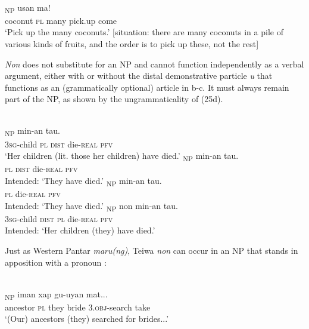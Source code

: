 \ea%
\label{ex:9:24}
 \\
\textsubscript{NP} usan ma! \\
  coconut \textsc{pl} many pick.up come  \\
\glt `Pick up the many coconuts.' [situation: there are many coconuts in a pile of various kinds of fruits, and the order is to pick up these, not the rest]
\z






\textit{Non} does not substitute for an NP and cannot function independently as a verbal argument, either with or without the distal demonstrative particle \textit{u} that functions as an (grammatically optional) article in b-c. It must always remain part of the NP, as shown by the ungrammaticality of (25d).


\ea%
\label{ex:9:25}
 \\
\ea
{}\textsubscript{NP} min-an tau. \\
   \textsc{3sg}-child \textsc{pl} \textsc{dist} die-\textsc{real} \textsc{pfv} \\
\glt `Her children (lit. those her children) have died.'
\ex
\gll *[Non u]\textsubscript{NP} min-an tau. \\
   \textsc{pl} \textsc{dist} die-\textsc{real} \textsc{pfv} \\
\glt  Intended: `They have died.'
\ex
\gll *[{Non}]\textsubscript{NP} min-an tau. \\
    \textsc{pl} die-\textsc{real} \textsc{pfv} \\
\glt  Intended: `They have died.'
\ex
\gll *[{G-oqai}   {u}]\textsubscript{NP} non min-an tau. \\
  \textsc{3sg}-child \textsc{dist} \textsc{pl} die-\textsc{real} \textsc{pfv}  \\
\glt  Intended: `Her children (they) have died.'
\z
\z






Just as Western Pantar \textit{maru(ng)}, Teiwa \textit{non} can occur in an NP that stands in apposition with a pronoun :


\ea%
\label{ex:9:26}
 \\
\textsubscript{NP} iman xap gu-uyan mat... \\
  ancestor \textsc{pl} they bride  3.\textsc{obj-}search take  \\
\glt `(Our) ancestors (they) searched for brides...'
\z






